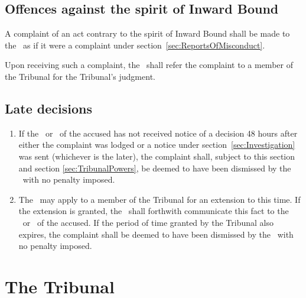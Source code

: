 \documentclass[12pt]{report}
\begin{document}
  \section{Offences against the spirit of Inward Bound}
  \begin{fenumerate}
    \item A complaint of an act contrary to the spirit of Inward Bound shall be made to the \Referee\ as if it were a complaint under section~\ref{sec:ReportsOfMisconduct}.
    \item Upon receiving such a complaint, the \Referee\ shall refer the complaint to a member of the Tribunal for the Tribunal's judgment.
  \end{fenumerate}
  \section{Late decisions}\label{sec:LateDecisions}
  \begin{enumerate}
    \item If the \President\ or \Captain\ of the accused has not received notice of a decision 48 hours after either the complaint was lodged or a notice under section~\ref{sec:Investigation} was sent (whichever is the later), the complaint shall, subject to this section and section \ref{sec:TribunalPowers}, be deemed to have been dismissed by the \Referee\ with no penalty imposed.
    \item The \Referee\ may apply to a member of the Tribunal for an extension to this time. If the extension is granted, the \Referee\ shall forthwith communicate this fact to the \President\ or \Captain\ of the accused. If the period of time granted by the Tribunal also expires, the complaint shall be deemed to have been dismissed by the \Referee\ with no penalty imposed.
  \end{enumerate}

  \chapter{The Tribunal}
\end{document}
